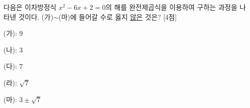 다음은 이차방정식 $x^2-6x+2=0$의 해를 완전제곱식을 이용하여 구하는 과정을 나타낸 것이다. (가)$\sim$(마)에 들어갈 수로 옳지 \underline{않은} 것은? \mbox{[4점]}
\begin{choices32}{\rule[-3ex]{0pt}{8ex}(가): $9$}{\rule[-3ex]{0pt}{8ex}(나): $3$}{\rule[-3ex]{0pt}{8ex}(다): $7$}{\rule[-3ex]{0pt}{8ex}(라): $\sqrt{7}$}{\rule[-3ex]{0pt}{8ex}(마): $3\pm\sqrt{7}$}\end{choices32}
